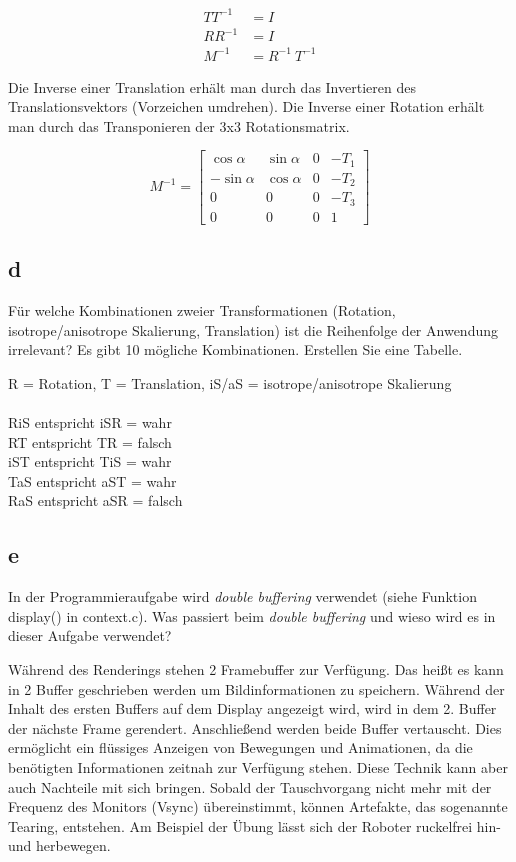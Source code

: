 \documentclass[12pt]{scrreprt}
\begin{document}
\begin{align*}
	TT^{-1} &= I \\
	RR^{-1} &= I \\
	M^{-1} &= R^{-1} ~ T^{-1}
\end{align*}

Die Inverse einer Translation erhält man durch das Invertieren des Translationsvektors (Vorzeichen umdrehen).
Die Inverse einer Rotation erhält man durch das Transponieren der 3x3 Rotationsmatrix.

\[
 M^{-1} = \begin{bmatrix}
       \cos \alpha & \sin\alpha & 0 & -T_1 \\[0.3em]
       -\sin\alpha & \cos\alpha & 0 & -T_2 \\[0.3em]
       0           & 0          & 0 & -T_3 \\[0.3em]
       0           & 0          & 0 & 1
     \end{bmatrix}
\]

\subsection*{d}

Für welche Kombinationen zweier Transformationen (Rotation, isotrope/anisotrope Skalierung,
Translation) ist die Reihenfolge der Anwendung irrelevant? Es gibt 10 mögliche Kombinationen. Erstellen
Sie eine Tabelle.

R = Rotation, T = Translation,  iS/aS = isotrope/anisotrope Skalierung\\
\\
RiS entspricht iSR = wahr\\
RT entspricht TR   = falsch\\
iST entspricht TiS = wahr\\
TaS entspricht aST = wahr\\
RaS entspricht aSR = falsch\\

\subsection*{e}

In der Programmieraufgabe wird \emph{double buffering} verwendet (siehe Funktion display() in
context.c). Was passiert beim \emph{double buffering} und wieso wird es in dieser Aufgabe verwendet?

Während des Renderings stehen 2 Framebuffer zur Verfügung. Das heißt es kann in 2 Buffer geschrieben werden um Bildinformationen zu speichern. Während der Inhalt des ersten Buffers auf dem Display angezeigt wird, wird in dem 2. Buffer der nächste Frame gerendert. Anschließend werden beide Buffer vertauscht. Dies ermöglicht ein flüssiges Anzeigen von Bewegungen und Animationen, da die benötigten Informationen zeitnah zur Verfügung stehen. Diese Technik kann aber auch Nachteile mit sich bringen. Sobald der Tauschvorgang nicht mehr mit der Frequenz des Monitors (Vsync) übereinstimmt, können Artefakte, das sogenannte Tearing, entstehen. Am Beispiel der Übung lässt sich der Roboter ruckelfrei hin- und herbewegen.
\end{document}
